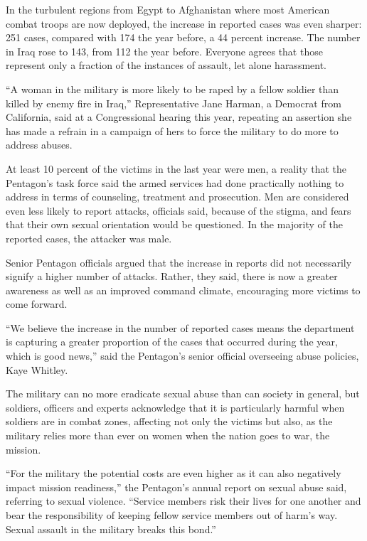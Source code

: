 ﻿\documentclass[12pt]{article}
\begin{document}
In the turbulent regions from Egypt to Afghanistan where most American combat troops are now
deployed, the increase in reported cases was even sharper: 251 cases, compared with 174 the year
before, a 44 percent increase. The number in Iraq rose to 143, from 112 the year before. Everyone
agrees that those represent only a fraction of the instances of assault, let alone harassment.

``A woman in the military is more likely to be raped by a fellow soldier than killed by enemy fire
in Iraq,'' Representative Jane Harman, a Democrat from California, said at a Congressional hearing
this year, repeating an assertion she has made a refrain in a campaign of hers to force the military
to do more to address abuses.

At least 10 percent of the victims in the last year were men, a reality that the Pentagon's task
force said the armed services had done practically nothing to address in terms of counseling,
treatment and prosecution. Men are considered even less likely to report attacks, officials said,
because of the stigma, and fears that their own sexual orientation would be questioned. In the
majority of the reported cases, the attacker was male.

Senior Pentagon officials argued that the increase in reports did not necessarily signify a higher
number of attacks. Rather, they said, there is now a greater awareness as well as an improved
command climate, encouraging more victims to come forward.

``We believe the increase in the number of reported cases means the department is capturing a
greater proportion of the cases that occurred during the year, which is good news,'' said the
Pentagon's senior official overseeing abuse policies, Kaye Whitley.

The military can no more eradicate sexual abuse than can society in general, but soldiers, officers
and experts acknowledge that it is particularly harmful when soldiers are in combat zones, affecting
not only the victims but also, as the military relies more than ever on women when the nation goes
to war, the mission.

``For the military the potential costs are even higher as it can also negatively impact mission
readiness,'' the Pentagon's annual report on sexual abuse said, referring to sexual violence.
``Service members risk their lives for one another and bear the responsibility of keeping fellow
service members out of harm's way. Sexual assault in the military breaks this bond.''
\end{document}
